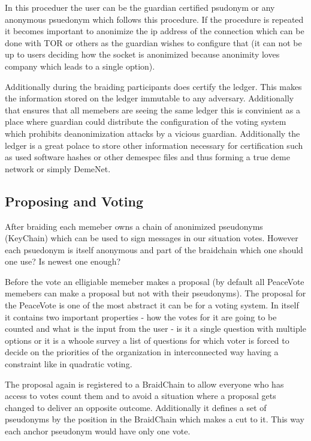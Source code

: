 \documentclass{article}
\begin{document}
In this proceduer the user can be the guardian certified psudonym or any anonymous psuedonym which follows this procedure. If the procedure is repeated it becomes important to anonimize the ip address of the connection which can be done with TOR or others as the guardian wishes to configure that (it can not be up to users deciding how the socket is anonimized because anonimity loves company which leads to a single option).

Additionally during the braiding participants does certify the ledger. This makes the information stored on the ledger immutable to any adversary. Additionally that ensures that all memebers are seeing the same ledger this is convinient as a place where guardian could distribute the configuration of the voting system which prohibits deanonimization attacks by a vicious guardian. Additionally the ledger is a great polace to store other information necessary for certification such as used software hashes or other demespec files and thus forming a true deme network or simply DemeNet.

\subsection{Proposing and Voting}

After braiding each memeber owns a chain of anonimized pseudonyms (KeyChain) which can be used to sign messages in our situation votes. However each psuedonym is itself anonymous and part of the braidchain which one should one use? Is newest one enough? 

Before the vote an elligiable memeber makes a proposal (by default all PeaceVote memebers can make a proposal but not with their pseudonyms). The proposal for the PeaceVote is one of the most abstract it can be for a voting system. In itself it contains two important properties - how the votes for it are going to be counted and what is the input from the user - is it a single question with multiple options or it is a whoole survey a list of questions for which voter is forced to decide on the priorities of the organization in interconnected way having a constraint like in quadratic voting.

The proposal again is registered to a BraidChain to allow everyone who has access to votes count them and to avoid a situation where a proposal gets changed to deliver an opposite outcome. Additionally it defines a set of pseudonyms by the position in the BraidChain which makes a cut to it. This way each anchor pseudonym would have only one vote.
\end{document}
